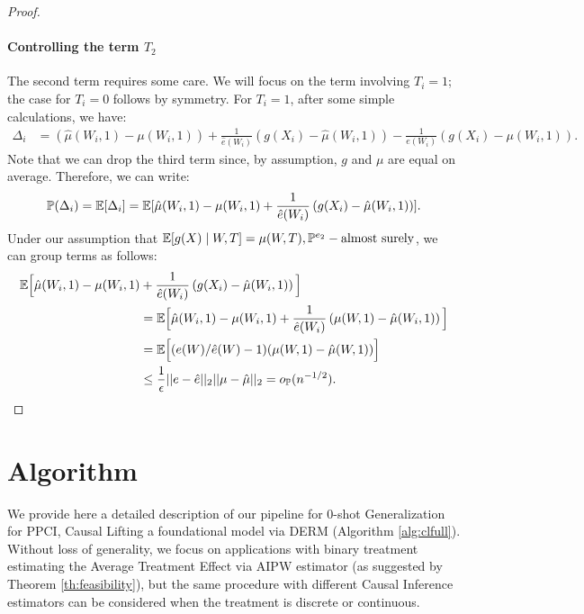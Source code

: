\begin{proof}
\paragraph{Controlling the term $T_2$}The second term requires some care. We will focus on the term involving $ T_i = 1 $; the case for $ T_i = 0 $ follows by symmetry.
For \( T_i = 1 \), after some simple calculations, we have:
\begin{align*}
\Delta_i &= \left( \hat{\mu}(W_i, 1) - \mu(W_i, 1) \right) + \frac{1}{\hat{e}(W_i)} \left( g(X_i) - \hat{\mu}(W_i, 1) \right) - \frac{1}{e(W_i)} \left( g(X_i) - \mu(W_i, 1) \right).
\end{align*}
Note that we can drop the third term since, by assumption, $g$ and $\mu$ are equal on average. Therefore, we can write:
\begin{align*}
\mathbb P(\Delta_i) = \mathbb{E}[\Delta_i] = \mathbb{E}[\hat{\mu}(W_i, 1) - \mu(W_i, 1) + \frac{1}{\hat{e}(W_i)} \left( g(X_i) - \hat{\mu}(W_i, 1) \right)].
\end{align*}
Under our assumption that $\mathbb{E}[ g(X) \mid W, T]  = \mu(W,T), \mathbb{P}^{e_2}-\text{almost~surely}$, we can group terms as follows:
\begin{align*}
 \mathbb{E}\Big [\hat{\mu}(W_i, 1) - \mu(W_i, 1) 
 &+ \frac{1}{\hat{e}(W_i)} \left( g(X_i) - \hat{\mu}(W_i, 1) \right) \Big ] \\
 &= \mathbb{E}\Big [\hat{\mu}(W_i, 1) - \mu(W_i, 1) + \frac{1}{\hat{e}(W_i)} \left( \mu(W,1) - \hat{\mu}(W_i, 1) \right) \Big ] \\ 
 &=  \mathbb{E}\Big[(e(W)/\hat e(W) -1) ( \mu(W, 1) - \hat \mu(W,1) )\Big ] \\
 &\leq \frac{1}{\epsilon}|| e - \hat e||_2 || \mu - \hat \mu||_2 = o_{\mathbb P}(n^{-1/2}).
\end{align*}
\end{proof}

\newpage
\section{Algorithm}
\label{sec:algorithm}
We provide here a detailed description of our pipeline for 0-shot Generalization for PPCI, Causal Lifting a foundational model via DERM (Algorithm \ref{alg:clfull}). 
Without loss of generality, we focus on applications with binary treatment estimating the Average Treatment Effect via AIPW estimator (as suggested by Theorem \ref{th:feasibility}), but the same procedure with different Causal Inference estimators can be considered when the treatment is discrete or continuous.


